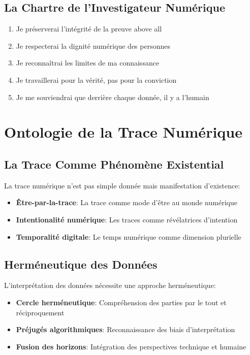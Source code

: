 \subsection{La Chartre de l'Investigateur Numérique}
\begin{enumerate}
\item Je préserverai l'intégrité de la preuve above all
\item Je respecterai la dignité numérique des personnes
\item Je reconnaîtrai les limites de ma connaissance
\item Je travaillerai pour la vérité, pas pour la conviction
\item Je me souviendrai que derrière chaque donnée, il y a l'humain
\end{enumerate}

\section{Ontologie de la Trace Numérique}
\subsection{La Trace Comme Phénomène Existential}
La trace numérique n'est pas simple donnée mais manifestation d'existence:
\begin{itemize}
\item \textbf{Être-par-la-trace}: La trace comme mode d'être au monde numérique
\item \textbf{Intentionalité numérique}: Les traces comme révélatrices d'intention
\item \textbf{Temporalité digitale}: Le temps numérique comme dimension plurielle
\end{itemize}

\subsection{Herméneutique des Données}
L'interprétation des données nécessite une approche herméneutique:
\begin{itemize}
\item \textbf{Cercle herméneutique}: Compréhension des parties par le tout et réciproquement
\item \textbf{Préjugés algorithmiques}: Reconnaissance des biais d'interprétation
\item \textbf{Fusion des horizons}: Intégration des perspectives technique et humaine
\end{itemize}

